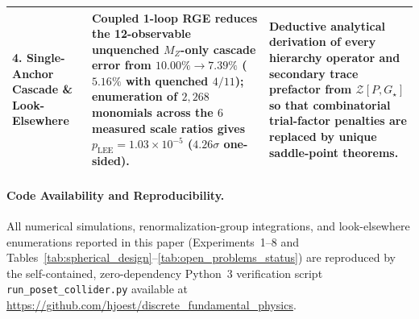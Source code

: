 \documentclass[11pt,a4paper]{article}
\theoremstyle{definition}
\theoremstyle{remark}
\newcommand{\Gstar}{G_\star}
\begin{document}
\begin{table}[!htbp]
{\begin{tabular}{@{}l>{\raggedright\arraybackslash}p{6.8cm}>{\raggedright\arraybackslash}p{6.2cm}@{}}
\addlinespace
\textbf{4. Single-Anchor Cascade \& Look-Elsewhere} & Coupled 1-loop RGE reduces the 12-observable unquenched $M_Z$-only cascade error from $10.00\% \to 7.39\%$ ($5.16\%$ with quenched $4/11$); enumeration of $2{,}268$ monomials across the $6$ measured scale ratios gives $p_{\mathrm{LEE}} = 1.03 \times 10^{-5}$ ($4.26\sigma$ one-sided). & Deductive analytical derivation of every hierarchy operator and secondary trace prefactor from $\mathcal{Z}[P, \Gstar]$ so that combinatorial trial-factor penalties are replaced by unique saddle-point theorems. \\
\bottomrule
\end{tabular}%
}
\end{table}

\paragraph{Code Availability and Reproducibility.}
All numerical simulations, renormalization-group integrations, and look-elsewhere enumerations reported in this paper (Experiments~1--8 and Tables~\ref{tab:spherical_design}--\ref{tab:open_problems_status}) are reproduced by the self-contained, zero-dependency Python~3 verification script \texttt{run\_poset\_collider.py} available at \url{https://github.com/hjoest/discrete_fundamental_physics}.

\clearpage
\end{document}
